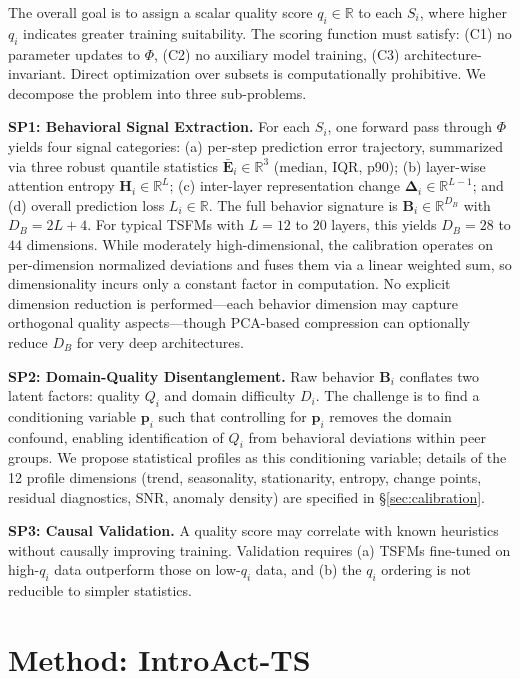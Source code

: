 \documentclass{article}
\begin{document}
The overall goal is to assign a scalar quality score $q_i \in \mathbb{R}$ to each $S_i$, where higher $q_i$ indicates greater training suitability. The scoring function must satisfy: (C1) no parameter updates to $\Phi$, (C2) no auxiliary model training, (C3) architecture-invariant. Direct optimization over subsets is computationally prohibitive. We decompose the problem into three sub-problems.

\textbf{SP1: Behavioral Signal Extraction.} For each $S_i$, one forward pass through $\Phi$ yields four signal categories: (a) per-step prediction error trajectory, summarized via three robust quantile statistics $\bar{\mathbf{E}}_i \in \mathbb{R}^{3}$ (median, IQR, p90); (b) layer-wise attention entropy $\mathbf{H}_i \in \mathbb{R}^{L}$; (c) inter-layer representation change $\boldsymbol{\Delta}_i \in \mathbb{R}^{L-1}$; and (d) overall prediction loss $L_i \in \mathbb{R}$. The full behavior signature is $\mathbf{B}_i \in \mathbb{R}^{D_B}$ with $D_B = 2L + 4$. For typical TSFMs with $L = 12$ to $20$ layers, this yields $D_B = 28$ to $44$ dimensions. While moderately high-dimensional, the calibration operates on per-dimension normalized deviations and fuses them via a linear weighted sum, so dimensionality incurs only a constant factor in computation. No explicit dimension reduction is performed---each behavior dimension may capture orthogonal quality aspects---though PCA-based compression can optionally reduce $D_B$ for very deep architectures.

\textbf{SP2: Domain-Quality Disentanglement.} Raw behavior $\mathbf{B}_i$ conflates two latent factors: quality $Q_i$ and domain difficulty $D_i$. The challenge is to find a conditioning variable $\mathbf{p}_i$ such that controlling for $\mathbf{p}_i$ removes the domain confound, enabling identification of $Q_i$ from behavioral deviations within peer groups. We propose statistical profiles as this conditioning variable; details of the 12 profile dimensions (trend, seasonality, stationarity, entropy, change points, residual diagnostics, SNR, anomaly density) are specified in \S\ref{sec:calibration}.

\textbf{SP3: Causal Validation.} A quality score may correlate with known heuristics without causally improving training. Validation requires (a) TSFMs fine-tuned on high-$q_i$ data outperform those on low-$q_i$ data, and (b) the $q_i$ ordering is not reducible to simpler statistics.

\section{Method: IntroAct-TS}
\end{document}
